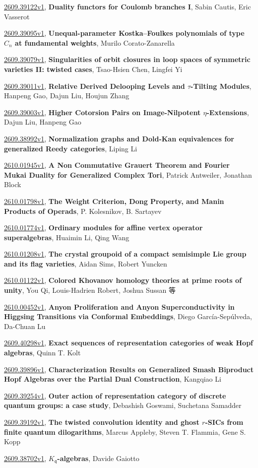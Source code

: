 \documentclass[9pt, a4paper]{article}
\theoremstyle{plain}
\theoremstyle{definition}
\theoremstyle{remark}
\newcommand{\arxiv}[3]{\href{https://arxiv.org/abs/#1}{#1}, \textbf{\textcolor{arxivblue}{#2}}, #3}
\begin{document}
\arxiv{2609.39122v1}{Duality functors for Coulomb branches I}{Sabin Cautis, Eric Vasserot}

\arxiv{2609.39095v1}{Unequal-parameter Kostka--Foulkes polynomials of type $C_n$ at fundamental weights}{Murilo Corato-Zanarella}

\arxiv{2609.39079v1}{Singularities of orbit closures in loop spaces of symmetric varieties II: twisted cases}{Tsao-Hsien Chen, Lingfei Yi}

\arxiv{2609.39011v1}{Relative Derived Delooping Levels and $τ$-Tilting Modules}{Hanpeng Gao, Dajun Liu, Houjun Zhang}

\arxiv{2609.39003v1}{Higher Cotorsion Pairs on Image-Nilpotent \(η\)-Extensions}{Dajun Liu, Hanpeng Gao}

\arxiv{2609.38992v1}{Normalization graphs and Dold-Kan equivalences for generalized Reedy categories}{Liping Li}

\arxiv{2610.01945v1}{A Non Commutative Grauert Theorem and Fourier Mukai Duality for Generalized Complex Tori}{Patrick Antweiler, Jonathan Block}

\arxiv{2610.01798v1}{The Weight Criterion, Dong Property, and Manin Products of Operads}{P. Kolesnikov, B. Sartayev}

\arxiv{2610.01774v1}{Ordinary modules for affine vertex operator superalgebras}{Huaimin Li, Qing Wang}

\arxiv{2610.01208v1}{The crystal groupoid of a compact semisimple Lie group and its flag varieties}{Aidan Sims, Robert Yuncken}

\arxiv{2610.01122v1}{Colored Khovanov homology theories at prime roots of unity}{You Qi, Louis-Hadrien Robert, Joshua Sussan 等}

\arxiv{2610.00452v1}{Anyon Proliferation and Anyon Superconductivity in Higgsing Transitions via Conformal Embeddings}{Diego García-Sepúlveda, Da-Chuan Lu}

\arxiv{2609.40298v1}{Exact sequences of representation categories of weak Hopf algebras}{Quinn T. Kolt}

\arxiv{2609.39896v1}{Characterization Results on Generalized Smash Biproduct Hopf Algebras over the Partial Dual Construction}{Kangqiao Li}

\arxiv{2609.39254v1}{Outer action of representation category of discrete quantum groups: a case study}{Debashish Goswami, Suchetana Samadder}

\arxiv{2609.39192v1}{The twisted convolution identity and ghost $r$-SICs from finite quantum dilogarithms}{Marcus Appleby, Steven T. Flammia, Gene S. Kopp}

\arxiv{2609.38702v1}{$K_{\mathfrak{q}}$-algebras}{Davide Gaiotto}

\end{document}
